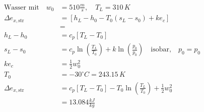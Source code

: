 

\item[(c)] 
    \begin{align*}
        \text{Wasser mit} \quad w_0 &= 510 \frac{m}{s}, \quad T_L = 310 \, K \\
        \Delta e_{x,\text{str}} &= \left[ h_L - h_0 - T_0 (s_L - s_0) + ke_c \right] \\
        &= \\
        h_L - h_0 &= c_p [T_L - T_0] \\
        s_L - s_0 &= c_p \ln \left( \frac{T_L}{T_0} \right) + k \ln \left( \frac{p_0}{p_0} \right) \quad \text{isobar,} \quad p_0 = p_0 \\
        ke_c &= \frac{1}{2} w_0^2 \\
        T_0 &= -30^\circ C = 243.15 \, K \\
        \Delta e_{x,\text{str}} &= c_p \left[ T_L - T_0 \right] - T_0 \ln \left( \frac{T_L}{T_0} \right) + \frac{1}{2} w_0^2 \\
        &= \boxed{13.084 \frac{kJ}{kg}}
    \end{align*}